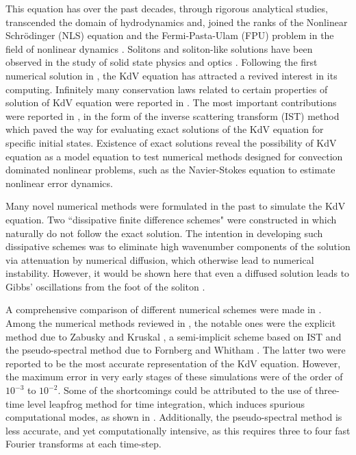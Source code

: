 This equation has over the past decades, through rigorous analytical studies, transcended the domain of hydrodynamics and, joined the ranks of the Nonlinear Schr\"odinger (NLS) equation and the Fermi-Pasta-Ulam (FPU) problem in the field of nonlinear dynamics \cite{Zabusky2005a}. Solitons and 
soliton-like solutions have been observed in the study of solid state physics \cite{Seeger1953} and optics \cite{Hasegawa1973}. Following the first numerical solution in \cite{Zabusky1965}, the KdV equation has attracted a revived interest in its computing. Infinitely many conservation laws related 
to certain properties of solution of KdV equation were reported in \cite{Miura1968,Whitham1965}. The most important contributions were reported in 
\cite{Gardner1967,Lax1968}, in the form of the inverse scattering transform (IST) method which paved the way for evaluating exact solutions of the KdV equation for specific initial states. Existence of exact solutions reveal the possibility of KdV equation as a model equation to test numerical methods designed for convection dominated nonlinear problems, such as the Navier-Stokes equation to estimate nonlinear error dynamics. 

Many novel numerical methods were formulated in the past to simulate the KdV equation. Two ``dissipative finite difference schemes" were constructed in \cite{Vliegenthart1971} which naturally do not follow the exact solution. The intention in developing such dissipative schemes was to eliminate high wavenumber components of the solution via attenuation by numerical diffusion, which otherwise lead to numerical instability. However, it would be shown 
here that even a diffused solution leads to Gibbs' oscillations from the foot of the soliton \cite{Sengupta2004a}.

A comprehensive comparison of different numerical schemes were made in \cite{Taha1984}. Among the numerical methods reviewed in \cite{Taha1984}, the notable ones were the explicit method due to Zabusky and Kruskal \cite{Zabusky1965}, a semi-implicit scheme based on IST and the pseudo-spectral method due to Fornberg and Whitham \cite{Fornberg1978}. The latter two were reported to be the most accurate representation of the KdV equation. However, the maximum error in very early stages of these simulations were of the order of $10^{-3}$ to $10^{-2}$. Some of the shortcomings 
could be attributed to the use of three-time level leapfrog method for time integration, which induces spurious computational modes, as shown in \cite{Sengupta2013a,Sengupta2004}. Additionally, the pseudo-spectral method is less accurate, and yet computationally intensive, as this requires three to 
four fast Fourier transforms at each time-step.


